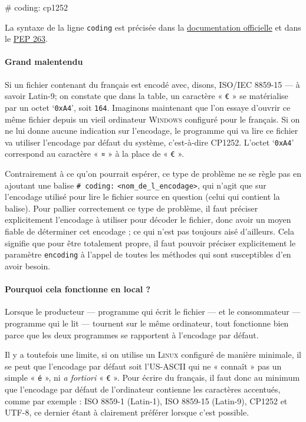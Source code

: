 \begin{nbjupyterin}[before skip=4pt,after skip=6pt]{}
# coding: cp1252
\end{nbjupyterin}

La syntaxe de la ligne \texttt{coding} est précisée dans la \href{https://docs.python.org/3/reference/lexical_analysis.html\#encoding-declarations}{documentation officielle} et dans le \href{https://www.python.org/dev/peps/pep-0263/}{PEP 263}.

\paragraph{Grand malentendu} Si un fichier contenant du français est encodé avec, disons, ISO/IEC 8859-15 --- à savoir Latin-9; on constate que dans la table, un caractère « \texttt{€} » se matérialise par un octet `\texttt{0xA4}', soit \texttt{164}. Imaginons maintenant que l'on essaye d'ouvrir ce même fichier depuis un vieil ordinateur \textsc{Windows} configuré pour le français. Si on ne lui donne aucune indication sur l'encodage, le programme qui va lire ce fichier va utiliser l'encodage par défaut du système, c'est-à-dire CP1252. L'octet `\texttt{0xA4}' correspond au caractère « \texttt{¤} » à la place de « \texttt{€} ».

Contrairement à ce qu'on pourrait espérer, ce type de problème ne se règle pas en ajoutant une balise \texttt{\# coding:} \texttt{<nom\_de\_l\_encodage>}, qui n'agit que sur l'encodage utilisé pour lire le fichier source en question (celui qui contient la balise).
Pour pallier correctement ce type de problème, il faut préciser explicitement l'encodage à utiliser pour décoder le fichier, donc avoir un moyen fiable de déterminer cet encodage ; ce qui n'est pas toujours aisé d'ailleurs. Cela signifie que pour être totalement propre, il faut pouvoir préciser explicitement le paramètre \texttt{encoding} à l'appel de toutes les méthodes qui sont susceptibles d'en avoir besoin.

\paragraph{Pourquoi cela fonctionne en local ?} Lorsque le producteur --- programme qui écrit le fichier --- et le consommateur --- programme qui le lit --- tournent sur le même ordinateur, tout fonctionne bien parce que les deux programmes se rapportent à l'encodage par défaut.

Il y a toutefois une limite, si on utilise un \textsc{Linux} configuré de manière minimale, il se peut que l'encodage par défaut soit l'US-ASCII qui ne « connaît » pas un simple « \texttt{é} », ni \textit{a fortiori} « \texttt{€} ». Pour écrire du français, il faut donc au minimum que l'encodage par défaut de l'ordinateur contienne les caractères accentués, comme par exemple : ISO 8859-1 (Latin-1), ISO 8859-15 (Latin-9), CP1252 et UTF-8, ce dernier étant à clairement préférer lorsque c'est possible.

